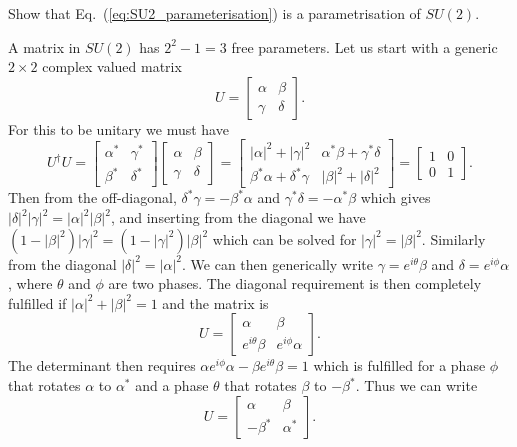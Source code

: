 \documentclass[notes.tex]{subfiles}
\begin{document}
\begin{Exercise}[]
Show that Eq.~(\ref{eq:SU2_parameterisation}) is a parametrisation of $SU(2)$.
\end{Exercise}
\begin{Answer}
A matrix in $SU(2)$ has $2^2-1=3$ free parameters. Let us start with a generic $2\times2$ complex valued matrix
\[ U=\left[ \begin{matrix} \alpha & \beta \\ \gamma & \delta \end{matrix} \right]. \]
For this to be unitary we must have 
\[ U^\dagger U=\left[ \begin{matrix} \alpha^* & \gamma^* \\ \beta^* & \delta^* \end{matrix} \right]\left[ \begin{matrix} \alpha & \beta \\ \gamma & \delta \end{matrix} \right] 
=\left[ \begin{matrix} |\alpha|^2+|\gamma|^2 & \alpha^*\beta+\gamma^*\delta \\ \beta^*\alpha+\delta^*\gamma & |\beta|^2+|\delta|^2 \end{matrix} \right]
=\left[ \begin{matrix} 1 & 0 \\ 0 & 1 \end{matrix} \right].\]
Then from the off-diagonal, $\delta^*\gamma=-\beta^*\alpha$ and $\gamma^*\delta=-\alpha^*\beta$ which gives $|\delta|^2|\gamma|^2= |\alpha|^2 |\beta|^2$, and inserting from the diagonal we have $(1-|\beta|^2)|\gamma|^2= (1-|\gamma|^2) |\beta|^2$ which can be solved for $|\gamma|^2= |\beta|^2$. Similarly from the diagonal $|\delta|^2=|\alpha|^2$. We can then generically  write $\gamma=e^{i\theta}\beta$ and $\delta=e^{i\phi}\alpha$, where $\theta$ and $\phi$ are two phases. The diagonal requirement is then completely fulfilled if $|\alpha|^2+|\beta|^2=1$ and the matrix is
\[ U=\left[ \begin{matrix} \alpha & \beta \\ e^{i\theta}\beta & e^{i\phi}\alpha \end{matrix} \right]. \]
The determinant then requires $\alpha e^{i\phi}\alpha-\beta e^{i\theta}\beta=1$ which is fulfilled for a phase $\phi$ that rotates $\alpha$ to  $\alpha^*$ and a phase $\theta$ that rotates $\beta$ to $-\beta^*$. Thus we can write
\[ U=\left[ \begin{matrix} \alpha & \beta \\ -\beta^* & \alpha^* \end{matrix} \right]. \]
\end{Answer}
\end{document}
